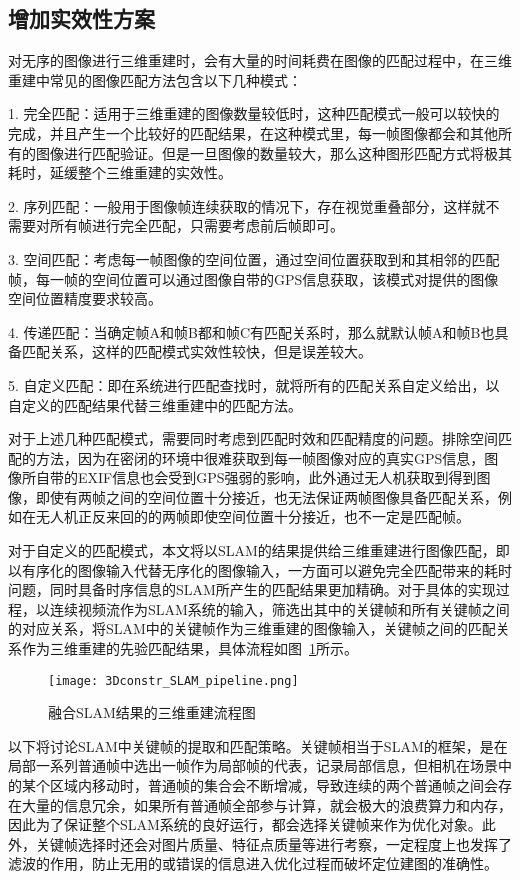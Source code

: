 \subsection{增加实效性方案}
\label{sec:3.3.2}对无序的图像进行三维重建时，会有大量的时间耗费在图像的匹配过程中，在三维重建中常见的图像匹配方法包含以下几种模式：

1. 完全匹配：适用于三维重建的图像数量较低时，这种匹配模式一般可以较快的完成，并且产生一个比较好的匹配结果，在这种模式里，每一帧图像都会和其他所有的图像进行匹配验证。但是一旦图像的数量较大，那么这种图形匹配方式将极其耗时，延缓整个三维重建的实效性。

2. 序列匹配：一般用于图像帧连续获取的情况下，存在视觉重叠部分，这样就不需要对所有帧进行完全匹配，只需要考虑前后帧即可。

3. 空间匹配：考虑每一帧图像的空间位置，通过空间位置获取到和其相邻的匹配帧，每一帧的空间位置可以通过图像自带的GPS信息获取，该模式对提供的图像空间位置精度要求较高。

4. 传递匹配：当确定帧A和帧B都和帧C有匹配关系时，那么就默认帧A和帧B也具备匹配关系，这样的匹配模式实效性较快，但是误差较大。

5. 自定义匹配：即在系统进行匹配查找时，就将所有的匹配关系自定义给出，以自定义的匹配结果代替三维重建中的匹配方法。

对于上述几种匹配模式，需要同时考虑到匹配时效和匹配精度的问题。排除空间匹配的方法，因为在密闭的环境中很难获取到每一帧图像对应的真实GPS信息，图像所自带的EXIF信息也会受到GPS强弱的影响，此外通过无人机获取到得到图像，即使有两帧之间的空间位置十分接近，也无法保证两帧图像具备匹配关系，例如在无人机正反来回的的两帧即使空间位置十分接近，也不一定是匹配帧。

对于自定义的匹配模式，本文将以SLAM的结果提供给三维重建进行图像匹配，即以有序化的图像输入代替无序化的图像输入，一方面可以避免完全匹配带来的耗时问题，同时具备时序信息的SLAM所产生的匹配结果更加精确。对于具体的实现过程，以连续视频流作为SLAM系统的输入，筛选出其中的关键帧和所有关键帧之间的对应关系，将SLAM中的关键帧作为三维重建的图像输入，关键帧之间的匹配关系作为三维重建的先验匹配结果，具体流程如图~\ref{fig:3Dconstr_SLAM_pipeline}所示。
\begin{figure}[h] %
  \centering
  \texttt{[image: 3Dconstr\_SLAM\_pipeline.png]}
  \caption{融合SLAM结果的三维重建流程图}
  \label{fig:3Dconstr_SLAM_pipeline}
\end{figure}

以下将讨论SLAM中关键帧的提取和匹配策略。关键帧相当于SLAM的框架，是在局部一系列普通帧中选出一帧作为局部帧的代表，记录局部信息，但相机在场景中的某个区域内移动时，普通帧的集合会不断增减，导致连续的两个普通帧之间会存在大量的信息冗余，如果所有普通帧全部参与计算，就会极大的浪费算力和内存， 因此为了保证整个SLAM系统的良好运行，都会选择关键帧来作为优化对象。此外，关键帧选择时还会对图片质量、特征点质量等进行考察，一定程度上也发挥了滤波的作用，防止无用的或错误的信息进入优化过程而破坏定位建图的准确性。

